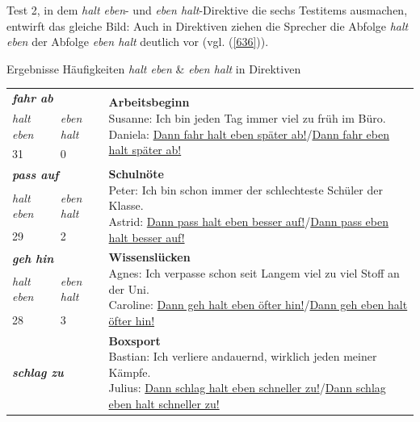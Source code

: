 Test 2, in dem \textit{halt eben}- und \textit{eben halt}-Direktive  die sechs Testitems ausmachen, entwirft das gleiche Bild: Auch in Direktiven ziehen die Sprecher die Abfolge \textit{halt eben} der Abfolge \textit{eben halt} deutlich vor (vgl. (\ref{636})).
\pagebreak
\begin{exe}
\renewcommand{\arraystretch}{1.75}
\ex\label{636} Ergebnisse Häufigkeiten \emph{halt eben} \& \emph{eben halt} in Direktiven\\[-0.6em]
\scriptsize
\begin{tabular}[t]{|l|l|p{30em}|}
\hline
\multicolumn{2}{|l|}{\textbf{\textit{fahr ab}}}& \multirow{3}{28em}{\textbf{Arbeitsbeginn}\newline Susanne: Ich bin jeden Tag immer viel zu früh im Büro.\newline Daniela: \underline{Dann fahr halt eben später ab!}/\underline{Dann fahr eben halt später ab!}}\\
\cline{1-2}
\emph{halt eben}& \emph{eben halt} & {}\\
\cline{1-2}
31 & 0 & {}\\
\hline
\multicolumn{2}{|l|}{\textbf{\textit{pass auf}}}& \multirow{3}{28em}{\textbf{Schulnöte}\newline Peter: Ich bin schon immer der schlechteste Schüler der Klasse. \newline Astrid: \underline{Dann pass halt eben besser auf!}/\underline{Dann pass eben halt besser auf!}}\\
\cline{1-2}
\emph{halt eben}& \emph{eben halt} & {}\\
\cline{1-2}
29 & 2 & {}\\
\hline
\multicolumn{2}{|l|}{\textbf{\textit{geh hin}}}& \multirow{3}{28em}{\textbf{Wissenslücken
}\newline Agnes: Ich verpasse schon seit Langem viel zu viel Stoff an der Uni.\newline
Caroline: \underline{Dann geh halt eben öfter hin!}/\underline{Dann geh eben halt öfter hin!}}\\
\cline{1-2}
\emph{halt eben}& \emph{eben halt} & {}\\
\cline{1-2}
28 & 3 & {}\\
\hline
\multicolumn{2}{|l|}{\textbf{\textit{schlag zu}}}& \multirow{3}{28em}{\textbf{Boxsport}\newline Bastian: Ich verliere andauernd, wirklich jeden meiner Kämpfe. \newline Julius: \underline{Dann schlag halt eben schneller zu!}/\underline{Dann schlag eben halt schneller zu!}}\\

\end{tabular}
\end{exe}
